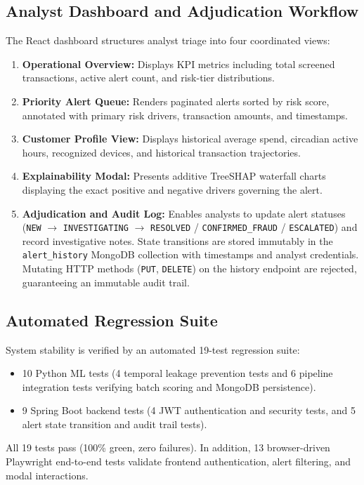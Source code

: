 \documentclass[conference]{IEEEtran}
\begin{document}
\subsection{Analyst Dashboard and Adjudication Workflow}
The React dashboard structures analyst triage into four coordinated views:
\begin{enumerate}
    \item \textbf{Operational Overview:} Displays KPI metrics including total screened transactions, active alert count, and risk-tier distributions.
    \item \textbf{Priority Alert Queue:} Renders paginated alerts sorted by risk score, annotated with primary risk drivers, transaction amounts, and timestamps.
    \item \textbf{Customer Profile View:} Displays historical average spend, circadian active hours, recognized devices, and historical transaction trajectories.
    \item \textbf{Explainability Modal:} Presents additive TreeSHAP waterfall charts displaying the exact positive and negative drivers governing the alert.
    \item \textbf{Adjudication and Audit Log:} Enables analysts to update alert statuses (\texttt{NEW} $\to$ \texttt{INVESTIGATING} $\to$ \texttt{RESOLVED} / \texttt{CONFIRMED\_FRAUD} / \texttt{ESCALATED}) and record investigative notes. State transitions are stored immutably in the \texttt{alert\_history} MongoDB collection with timestamps and analyst credentials. Mutating HTTP methods (\texttt{PUT}, \texttt{DELETE}) on the history endpoint are rejected, guaranteeing an immutable audit trail.
\end{enumerate}

\subsection{Automated Regression Suite}
System stability is verified by an automated 19-test regression suite:
\begin{itemize}
    \item 10 Python ML tests (4 temporal leakage prevention tests and 6 pipeline integration tests verifying batch scoring and MongoDB persistence).
    \item 9 Spring Boot backend tests (4 JWT authentication and security tests, and 5 alert state transition and audit trail tests).
\end{itemize}
All 19 tests pass (100\% green, zero failures). In addition, 13 browser-driven Playwright end-to-end tests validate frontend authentication, alert filtering, and modal interactions.
\end{document}
